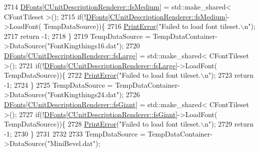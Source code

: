 \begin{DoxyCode}
2714     \hyperlink{classCApplicationData_afde9247d0a3ea87393ec86dcdb1e8274}{DFonts}[\hyperlink{classCUnitDescriptionRenderer_a3ea4cd83b6dd9533ab3abb953a7da35aa7b5aa12d8a01b317ebfbf1bd65d7e568}{CUnitDescriptionRenderer::fsMedium}] = std::make\_shared<
       CFontTileset >();
2715     \textcolor{keywordflow}{if}(!\hyperlink{classCApplicationData_afde9247d0a3ea87393ec86dcdb1e8274}{DFonts}[\hyperlink{classCUnitDescriptionRenderer_a3ea4cd83b6dd9533ab3abb953a7da35aa7b5aa12d8a01b317ebfbf1bd65d7e568}{CUnitDescriptionRenderer::fsMedium}]->LoadFont(
      TempDataSource))\{
2716         \hyperlink{Debug_8h_a2ed825eefefe35baf59a93a8c641323d}{PrintError}(\textcolor{stringliteral}{"Failed to load font tileset.\(\backslash\)n"});
2717         \textcolor{keywordflow}{return} -1;
2718     \}
2719     TempDataSource = TempDataContainer->DataSource(\textcolor{stringliteral}{"FontKingthings16.dat"});
2720     \hyperlink{classCApplicationData_afde9247d0a3ea87393ec86dcdb1e8274}{DFonts}[\hyperlink{classCUnitDescriptionRenderer_a3ea4cd83b6dd9533ab3abb953a7da35aaf467097fe4f4811a5e2f1959c86e071d}{CUnitDescriptionRenderer::fsLarge}] = std::make\_shared<
       CFontTileset >();
2721     \textcolor{keywordflow}{if}(!\hyperlink{classCApplicationData_afde9247d0a3ea87393ec86dcdb1e8274}{DFonts}[\hyperlink{classCUnitDescriptionRenderer_a3ea4cd83b6dd9533ab3abb953a7da35aaf467097fe4f4811a5e2f1959c86e071d}{CUnitDescriptionRenderer::fsLarge}]->LoadFont(
      TempDataSource))\{
2722         \hyperlink{Debug_8h_a2ed825eefefe35baf59a93a8c641323d}{PrintError}(\textcolor{stringliteral}{"Failed to load font tileset.\(\backslash\)n"});
2723         \textcolor{keywordflow}{return} -1;
2724     \}
2725     TempDataSource = TempDataContainer->DataSource(\textcolor{stringliteral}{"FontKingthings24.dat"});
2726     \hyperlink{classCApplicationData_afde9247d0a3ea87393ec86dcdb1e8274}{DFonts}[\hyperlink{classCUnitDescriptionRenderer_a3ea4cd83b6dd9533ab3abb953a7da35aa6194fc38e2cf8a4f891a90cbed5eafdd}{CUnitDescriptionRenderer::fsGiant}] = std::make\_shared<
       CFontTileset >();
2727     \textcolor{keywordflow}{if}(!\hyperlink{classCApplicationData_afde9247d0a3ea87393ec86dcdb1e8274}{DFonts}[\hyperlink{classCUnitDescriptionRenderer_a3ea4cd83b6dd9533ab3abb953a7da35aa6194fc38e2cf8a4f891a90cbed5eafdd}{CUnitDescriptionRenderer::fsGiant}]->LoadFont(
      TempDataSource))\{
2728         \hyperlink{Debug_8h_a2ed825eefefe35baf59a93a8c641323d}{PrintError}(\textcolor{stringliteral}{"Failed to load font tileset.\(\backslash\)n"});
2729         \textcolor{keywordflow}{return} -1;
2730     \}
2731     
2732     
2733     TempDataSource = TempDataContainer->DataSource(\textcolor{stringliteral}{"MiniBevel.dat"});

\end{DoxyCode}
